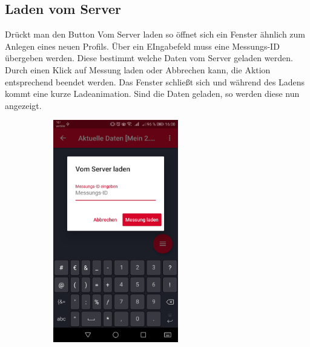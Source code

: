 	
		\subsection{Laden vom Server}
		\label{subsec:load-srv}
Drückt man den Button \glqq Vom Server laden\grqq{} so öffnet sich ein Fenster ähnlich zum Anlegen eines neuen Profils. Über ein EIngabefeld muss eine Messungs-ID übergeben werden. Diese bestimmt welche Daten vom Server geladen werden. Durch einen Klick auf \glqq Messung laden \grqq{} oder \glqq Abbrechen \grqq{} kann, die Aktion entsprechend beendet werden. Das Fenster schließt sich und während des Ladens kommt eine kurze Ladeanimation. Sind die Daten geladen, so werden diese nun angezeigt.\\
		
		\begin{figure}[H]
	\begin{subfigure}[b]{0.5\textwidth}
		\centering
		\includegraphics[width=0.6\textwidth]{../include/images/funktionalitaet/dataLaden_fromServer}
	\end{subfigure}
	\hfill
	\begin{subfigure}[b]{0.5\textwidth}
	\centering

\end{subfigure}
\end{figure}
